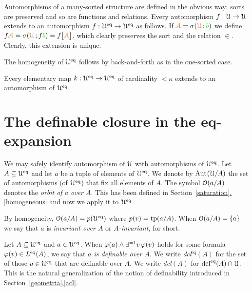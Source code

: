 \documentclass[creche.tex]{subfiles}
\begin{document}
Automorphisms of a many-sorted structure are defined in the obvious way: sorts are preserved and so are functions and relations.
Every automorphism $f:\EuScript U\rightarrow\EuScript U$ extends to an automorphism $f:\EuScript U^{{\rm eq}}\rightarrow\EuScript U^{{\rm eq}}$ as follows.
If ${\color{brown}\EuScript A}=\sigma({\color{brown}\EuScript U}\,;{\color{green} b})$ we define $f{\color{brown}\EuScript A}=\sigma({\color{brown}\EuScript U}\,;f{\color{green} b})=f\big[{\color{brown}\EuScript A}\big]$, which clearly preserves the sort and the relation $\in$.
Clearly, this extension is unique.

The homogeneity of $\EuScript U^{{\rm eq}}$ follows by back-and-forth as in the one-sorted case.

\begin{proposition}\label{prop_Ueq_homogeneous}
Every elementary map $k:\EuScript U^{{\rm eq}}\to\EuScript U^{{\rm eq}}$ of cardinality $<\kappa$ extends to an automorphism of $\EuScript U^{{\rm eq}}$.\QED
\end{proposition} 

\section{The definable closure in the eq-expansion}
We may safely identify automorphism of $\EuScript U$ with automorphisms of $\EuScript U^{{\rm eq}}$.
Let $A\subseteq\EuScript U^{{\rm eq}}$ and let $a$ be a tuple of elements of $\EuScript U^{{{\rm eq}}}$.
We denote by \emph{$\textrm{Aut\kern.15ex}(\EuScript U/A)$\/} the set of automorphisms (of $\EuScript U^{{\rm eq}}$) that fix all elements of $A$.
The symbol \emph{$\EuScript O(a/A)$\/} denotes the \emph{orbit of $a$ over $A$}.
This has been defined in Section~\hyperref[homogeneous]{\ref*{saturation}.\ref*{homogeneous}} and now we apply it to $\EuScript U^{{\rm eq}}$


By homogeneity, $\EuScript O(a/A)=p(\EuScript U^{{\rm eq}})$ where $p(v)={\rm tp}(a/A)$.
When $\EuScript O(a/A)=\{a\}$ we say that $a$ is \emph{invariant over $A$\/} or \emph{$A$-invariant}, for short.


\begin{definition}\label{def_def}
Let $A\subseteq\EuScript U^{{\rm eq}}$ and $a\in\EuScript U^{{\rm eq}}$.
When $\varphi(a)\wedge\exists^{=1}v\,\varphi(v)$ holds for some formula $\varphi(v)\in L^{{\rm eq}}(A)$, we say that \emph{$a$ is definable over $A$}.
We write \emph{dcl$^\textrm{eq}(A)$\/} for the set of those $a\in\EuScript U^{{\rm eq}}$ that are definable over $A$.
We write \emph{dcl$(A)$\/} for $\mathop{\rm dcl}^{{\rm eq}}(A)\cap\EuScript U$.
This is the natural generalization of the notion of definability introduced in Section~\hyperref[acl]{\ref*{geometria}.\ref*{acl}}.\QED
\end{definition}
\end{document}
